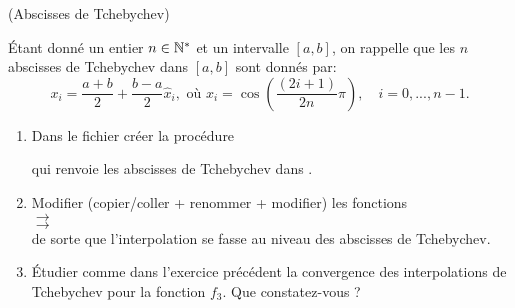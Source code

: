 \documentclass[a4paper,12pt,reqno]{amsart}
\begin{document}
\begin{exo} (Abscisses de Tchebychev)

  Étant donné un entier $n \in \mathbb{N}^*$ et un intervalle $[a,b]$, on rappelle que les $n$ abscisses de Tchebychev dans $[a,b]$ sont donnés par:
  $$
    x_i=\frac{a+b}{2}+\frac{b-a}{2} \hat{x}_i, \mbox{ où } \hat{x}_i=\cos\left(\displaystyle \frac{(2i+1)}{2n} \pi \right), \quad i=0,...,n-1.
  $$
  \begin{enumerate}

    \item Dans le fichier  créer la procédure
    \begin{center}
    \end{center}
    qui renvoie les  abscisses de Tchebychev dans \mtlb{[a,b]}.

    \item Modifier (copier/coller + renommer + modifier) les fonctions\\
     $\longrightarrow$ \\
     $\longrightarrow$ \\
    de sorte que l'interpolation se fasse au niveau des abscisses de Tchebychev.

    \item Étudier comme dans l'exercice précédent la convergence des interpolations de Tchebychev pour la fonction $f_{3}$. Que constatez-vous ?
  \end{enumerate}
\end{exo}


\end{document}
